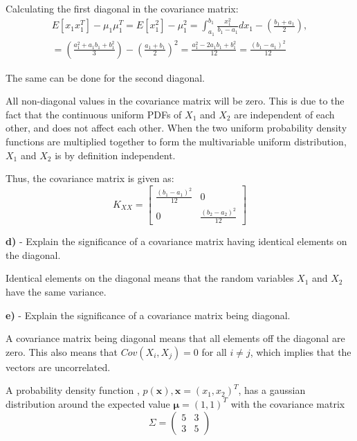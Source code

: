 \documentclass{homeworg}
\begin{document}
Calculating the first diagonal in the covariance matrix:
\begin{equation}
    \begin{aligned}
        E[x_1x_1^T]-\mu_1\mu_1^T = E[x_1^2] - \mu_1^2 =
        \int_{a_1}^{b_1}\frac{x_1^2}{b_1-a_1} dx_1 - \left(\frac{b_1+a_1}{2}\right), \\
        = \left(\frac{a_1^2+a_1b_1+b_1^2}{3}\right)-\left(\frac{a_1+b_1}{2}\right)^2
        =\frac{a_1^2-2a_1b_1+b_1^2}{12} = \frac{(b_1-a_1)^2}{12}
    \end{aligned}
\end{equation}

The same can be done for the second diagonal.

All non-diagonal values in the covariance matrix will be zero. This is due to the fact 
that the continuous uniform PDFs of $X_1$ and $X_2$ are independent of each other, 
and does not affect each other. When the two uniform probability density functions are multiplied 
together to form the multivariable uniform distribution, $X_1$ and $X_2$ is by definition independent.

Thus, the covariance matrix is given as:
\begin{equation}
    K_{XX} = 
    \begin{bmatrix}
        \frac{(b_1-a_1)^2}{12} & 0
        \\ 
        0 & \frac{(b_2-a_2)^2}{12}
    \end{bmatrix}
\end{equation}


\bigskip
\textbf{d)} - Explain the significance of a covariance matrix having identical elements
on the diagonal.
\smallskip

Identical elements on the diagonal means that the random variables $X_1$ and $X_2$ have the same variance.


\bigskip
\textbf{e)} - Explain the significance of a covariance matrix being diagonal.
\smallskip

A covariance matrix being diagonal means that all elements off the diagonal are zero.
This also means that $Cov(X_i, X_j) = 0$ for all $i \neq j$, 
which implies that the vectors are uncorrelated.

\newpage

\problem

A probability density function , $p(\bm{x}), \bm{x} = (x_1, x_2)^T$, has a gaussian distribution around the expected value $\bm{\mu} = (1, 1)^T$ with the covariance matrix
\begin{equation}
    \Sigma = 
    \begin{pmatrix}
        5&3 \\ 
        3&5 
    \end{pmatrix}
\end{equation}
\end{document}
